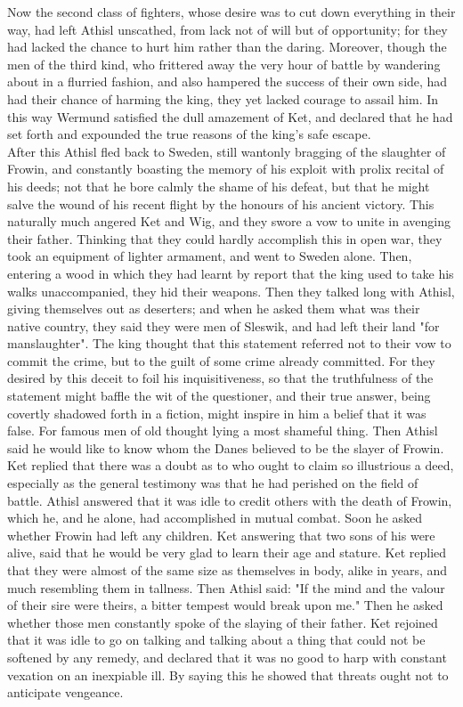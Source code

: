 \documentclass[10pt,a4paper]{report}
\begin{document}
Now the second class of fighters, whose desire was to cut down everything in their way, had left Athisl unscathed, from lack not of will but of opportunity; for they had lacked the chance to hurt him rather than the daring. Moreover, though the men of the third kind, who frittered away the very hour of battle by wandering about in a flurried fashion, and also hampered the success of their own side, had had their chance of harming the king, they yet lacked courage to assail him. In this way Wermund satisfied the dull amazement of Ket, and declared that he had set forth and expounded the true reasons of the king's safe escape.\\

After this Athisl fled back to Sweden, still wantonly bragging of the slaughter of Frowin, and constantly boasting the memory of his exploit with prolix recital of his deeds; not that he bore calmly the shame of his defeat, but that he might salve the wound of his recent flight by the honours of his ancient victory. This naturally much angered Ket and Wig, and they swore a vow to unite in avenging their father. Thinking that they could hardly accomplish this in open war, they took an equipment of lighter armament, and went to Sweden alone. Then, entering a wood in which they had learnt by report that the king used to take his walks unaccompanied, they hid their weapons. Then they talked long with Athisl, giving themselves out as deserters; and when he asked them what was their native country, they said they were men of Sleswik, and had left their land "for manslaughter". The king thought that this statement referred not to their vow to commit the crime, but to the guilt of some crime already committed. For they desired by this deceit to foil his inquisitiveness, so that the truthfulness of the statement might baffle the wit of the questioner, and their true answer, being covertly shadowed forth in a fiction, might inspire in him a belief that it was false. For famous men of old thought lying a most shameful thing. Then Athisl said he would like to know whom the Danes believed to be the slayer of Frowin. Ket replied that there was a doubt as to who ought to claim so illustrious a deed, especially as the general testimony was that he had perished on the field of battle. Athisl answered that it was idle to credit others with the death of Frowin, which he, and he alone, had accomplished in mutual combat. Soon he asked whether Frowin had left any children. Ket answering that two sons of his were alive, said that he would be very glad to learn their age and stature. Ket replied that they were almost of the same size as themselves in body, alike in years, and much resembling them in tallness. Then Athisl said: "If the mind and the valour of their sire were theirs, a bitter tempest would break upon me." Then he asked whether those men constantly spoke of the slaying of their father. Ket rejoined that it was idle to go on talking and talking about a thing that could not be softened by any remedy, and declared that it was no good to harp with constant vexation on an inexpiable ill. By saying this he showed that threats ought not to anticipate vengeance.\\
\end{document}
